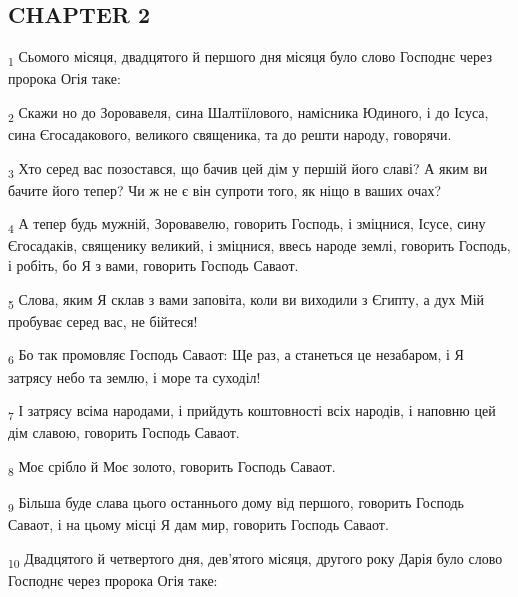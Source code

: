 \subsection{CHAPTER 2}
\begin{tcolorbox}
\textsubscript{1} Сьомого місяця, двадцятого й першого дня місяця було слово Господнє через пророка Огія таке:
\end{tcolorbox}
\begin{tcolorbox}
\textsubscript{2} Скажи но до Зоровавеля, сина Шалтіїлового, намісника Юдиного, і до Ісуса, сина Єгосадакового, великого священика, та до решти народу, говорячи.
\end{tcolorbox}
\begin{tcolorbox}
\textsubscript{3} Хто серед вас позостався, що бачив цей дім у першій його славі? А яким ви бачите його тепер? Чи ж не є він супроти того, як ніщо в ваших очах?
\end{tcolorbox}
\begin{tcolorbox}
\textsubscript{4} А тепер будь мужній, Зоровавелю, говорить Господь, і зміцнися, Ісусе, сину Єгосадаків, священику великий, і зміцнися, ввесь народе землі, говорить Господь, і робіть, бо Я з вами, говорить Господь Саваот.
\end{tcolorbox}
\begin{tcolorbox}
\textsubscript{5} Слова, яким Я склав з вами заповіта, коли ви виходили з Єгипту, а дух Мій пробуває серед вас, не бійтеся!
\end{tcolorbox}
\begin{tcolorbox}
\textsubscript{6} Бо так промовляє Господь Саваот: Ще раз, а станеться це незабаром, і Я затрясу небо та землю, і море та суходіл!
\end{tcolorbox}
\begin{tcolorbox}
\textsubscript{7} І затрясу всіма народами, і прийдуть коштовності всіх народів, і наповню цей дім славою, говорить Господь Саваот.
\end{tcolorbox}
\begin{tcolorbox}
\textsubscript{8} Моє срібло й Моє золото, говорить Господь Саваот.
\end{tcolorbox}
\begin{tcolorbox}
\textsubscript{9} Більша буде слава цього останнього дому від першого, говорить Господь Саваот, і на цьому місці Я дам мир, говорить Господь Саваот.
\end{tcolorbox}
\begin{tcolorbox}
\textsubscript{10} Двадцятого й четвертого дня, дев'ятого місяця, другого року Дарія було слово Господнє через пророка Огія таке:
\end{tcolorbox}
